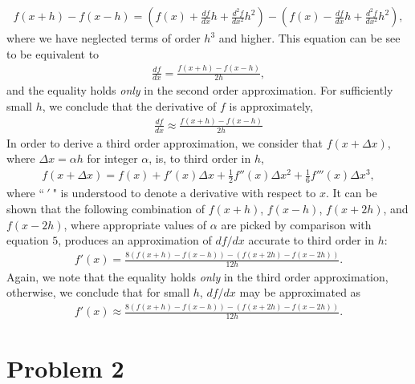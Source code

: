 \documentclass[letter,12pt]{article}
\begin{document}
\begin{align}
f(x+h) - f(x-h) = \left( f(x) + \frac{df}{dx}h + \frac{d^2 f}{dx^2}h^2 \right) - \left( f(x) - \frac{df}{dx}h + \frac{d^2 f}{dx^2} h^2 \right),
\end{align}
where we have neglected terms of order $h^3$ and higher. This equation can be see to be equivalent to 
\begin{align}
\frac{df}{dx} = \frac{f(x+h) - f(x-h)}{2h},
\end{align}
and the equality holds \emph{only} in the second order approximation. For sufficiently small $h$, we conclude that the derivative of $f$ is approximately,
\begin{align}
\frac{df}{dx} \approx \frac{f(x+h)-f(x-h)}{2h}
\end{align}
\noindent In order to derive a third order approximation, we consider that $f(x+\Delta x)$, where $\Delta x = \alpha h$ for integer $\alpha$, is, to third order in $h$,
\begin{align}
f(x+\Delta x) = f(x) + f'(x)\Delta x + \frac{1}{2} f''(x) \Delta x ^2 + \frac{1}{6} f'''(x) \Delta x ^3,
\end{align}
where ``$\ ' \ $" is understood to denote a derivative with respect to $x$. It can be shown that the following combination of $f(x+h)$, $f(x-h)$, $f(x+2h)$, and $f(x-2h)$, where appropriate values of $\alpha$ are picked by comparison with equation $5$,  produces an approximation of $df/dx$ accurate to third order in $h$:
\begin{align}
f'(x) = \frac{8 ( f(x+h)-f(x-h) ) - ( f(x+2h)-f(x-2h) ) }{12h}.
\end{align}
Again, we note that the equality holds \emph{only} in the third order approximation, otherwise, we conclude that for small $h$, $df/dx$ may be approximated as 
\begin{align}
f'(x) \approx \frac{8 ( f(x+h)-f(x-h) ) - ( f(x+2h)-f(x-2h) ) }{12h}.
\end{align}

\section{Problem 2}
\vspace{0.15in}
\end{document}

